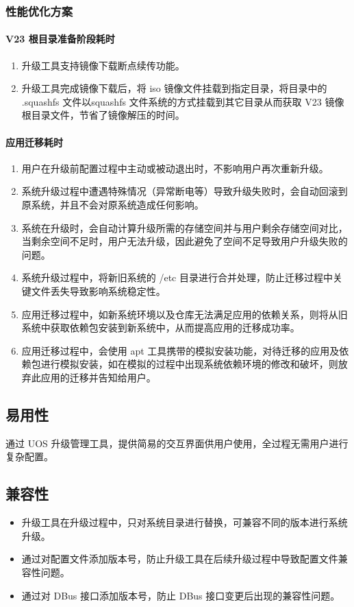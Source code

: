 \documentclass{utart}
\begin{document}
\subsubsection{性能优化方案}
\paragraph{V23 根目录准备阶段耗时}
\begin{enumerate}
    \item 升级工具支持镜像下载断点续传功能。
    \item 升级工具完成镜像下载后，将 iso 镜像文件挂载到指定目录，将目录中的 .squashfs 文件以squashfs 文件系统的方式挂载到其它目录从而获取 V23 镜像根目录文件，节省了镜像解压的时间。
\end{enumerate}

\paragraph{应用迁移耗时}
\begin{enumerate}
    \item 用户在升级前配置过程中主动或被动退出时，不影响用户再次重新升级。
    \item 系统升级过程中遭遇特殊情况（异常断电等）导致升级失败时，会自动回滚到原系统，并且不会对原系统造成任何影响。
    \item 系统在升级时，会自动计算升级所需的存储空间并与用户剩余存储空间对比，当剩余空间不足时，用户无法升级，因此避免了空间不足导致用户升级失败的问题。
    \item 系统升级过程中，将新旧系统的 /etc 目录进行合并处理，防止迁移过程中关键文件丢失导致影响系统稳定性。
    \item 应用迁移过程中，如新系统环境以及仓库无法满足应用的依赖关系，则将从旧系统中获取依赖包安装到新系统中，从而提高应用的迁移成功率。
    \item 应用迁移过程中，会使用 apt 工具携带的模拟安装功能，对待迁移的应用及依赖包进行模拟安装，如在模拟的过程中出现系统依赖环境的修改和破坏，则放弃此应用的迁移并告知给用户。
\end{enumerate} 

\subsection{易用性}
通过 UOS 升级管理工具，提供简易的交互界面供用户使用，全过程无需用户进行复杂配置。

\subsection{兼容性}
\begin{itemize}
    \item 升级工具在升级过程中，只对系统目录进行替换，可兼容不同的版本进行系统升级。
    \item 通过对配置文件添加版本号，防止升级工具在后续升级过程中导致配置文件兼容性问题。
    \item 通过对 DBus 接口添加版本号，防止 DBus 接口变更后出现的兼容性问题。
\end{itemize}
\end{document}
